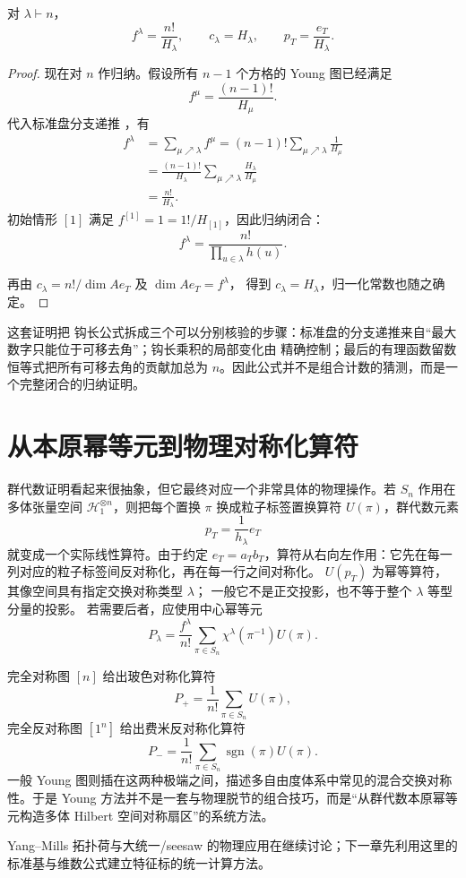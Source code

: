 \begin{theorem}
对 $\lambda\vdash n$，
\[
f^\lambda=\frac{n!}{H_\lambda},\qquad c_\lambda=H_\lambda,
\qquad p_T=\frac{e_T}{H_\lambda}.
\]
\end{theorem}

\begin{proof}
现在对 $n$ 作归纳。假设所有 $n-1$ 个方格的 Young 图已经满足
\[
f^\mu=\frac{(n-1)!}{H_\mu}.
\]
代入标准盘分支递推 ，有
\begin{align*}
f^\lambda
&=\sum_{\mu\nearrow\lambda}f^\mu
=(n-1)!\sum_{\mu\nearrow\lambda}\frac1{H_\mu}\\
&=\frac{(n-1)!}{H_\lambda}
\sum_{\mu\nearrow\lambda}\frac{H_\lambda}{H_\mu}\\
&=\frac{n!}{H_\lambda}.
\end{align*}
初始情形 $[1]$ 满足 $f^{[1]}=1=1!/H_{[1]}$，因此归纳闭合：
\[
f^\lambda=\frac{n!}{\displaystyle\prod_{u\in\lambda}h(u)}.
\]

再由 $c_\lambda=n!/\dim Ae_T$ 及 $\dim Ae_T=f^\lambda$，
得到 $c_\lambda=H_\lambda$，归一化常数也随之确定。
\end{proof}

这套证明把 钩长公式拆成三个可以分别核验的步骤：标准盘的分支递推来自“最大数字只能位于可移去角”；钩长乘积的局部变化由  精确控制；最后的有理函数留数恒等式把所有可移去角的贡献加总为 $n$。因此公式并不是组合计数的猜测，而是一个完整闭合的归纳证明。

\section{从本原幂等元到物理对称化算符}

群代数证明看起来很抽象，但它最终对应一个非常具体的物理操作。若 $S_n$ 作用在多体张量空间 $\mathcal H_1^{\otimes n}$，则把每个置换 $\pi$ 换成粒子标签置换算符 $U(\pi)$，群代数元素
\[
p_T=\frac1{h_\lambda}e_T
\]
就变成一个实际线性算符。由于约定 $e_T=a_Tb_T$，算符从右向左作用：它先在每一列对应的粒子标签间反对称化，再在每一行之间对称化。
$U(p_T)$ 为幂等算符，其像空间具有指定交换对称类型 $\lambda$；
一般它不是正交投影，也不等于整个 $\lambda$ 等型分量的投影。
若需要后者，应使用中心幂等元
\[
P_\lambda=\frac{f^\lambda}{n!}\sum_{\pi\in S_n}
\chi^\lambda(\pi^{-1})U(\pi).
\]

完全对称图 $[n]$ 给出玻色对称化算符
\[
P_+=\frac1{n!}\sum_{\pi\in S_n}U(\pi),
\]
完全反对称图 $[1^n]$ 给出费米反对称化算符
\[
P_-=\frac1{n!}\sum_{\pi\in S_n}\operatorname{sgn}(\pi)U(\pi).
\]
一般 Young 图则插在这两种极端之间，描述多自由度体系中常见的混合交换对称性。于是 Young 方法并不是一套与物理脱节的组合技巧，而是“从群代数本原幂等元构造多体 Hilbert 空间对称扇区”的系统方法。

Yang--Mills 拓扑荷与大统一/seesaw 的物理应用在继续讨论；下一章先利用这里的标准基与维数公式建立特征标的统一计算方法。
